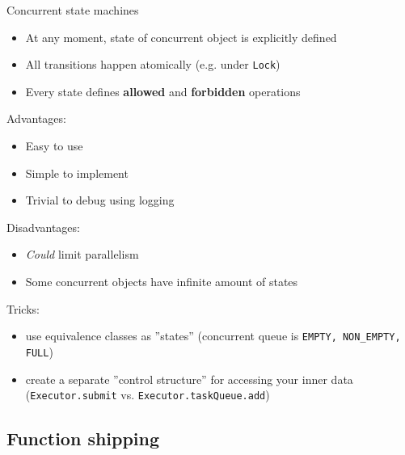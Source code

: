 \begin{frame}[fragile]{Concurrent state machines}

\begin{itemize}
    \item At any moment, state of concurrent object is explicitly defined
    \item All transitions happen atomically (e.g. under \texttt{Lock})
    \item Every state defines \textbf{allowed} and \textbf{forbidden} operations  
\end{itemize}

\pause

Advantages:
\begin{itemize}
    \item Easy to use
    \item Simple to implement
    \item Trivial to debug using logging
\end{itemize}

\pause
Disadvantages:
\begin{itemize}
    \item \textit{Could} limit parallelism
    \item Some concurrent objects have infinite amount of states
\end{itemize}

\pause
Tricks: 
\begin{itemize}
    \item use equivalence classes as ''states'' (concurrent queue is \texttt{EMPTY, NON\_EMPTY, FULL})
    \item create a separate ''control structure'' for accessing your inner data (\texttt{Executor.submit} vs. \texttt{Executor.taskQueue.add})
\end{itemize}

\end{frame}

\subsection{Function shipping}
\showTOCSub

